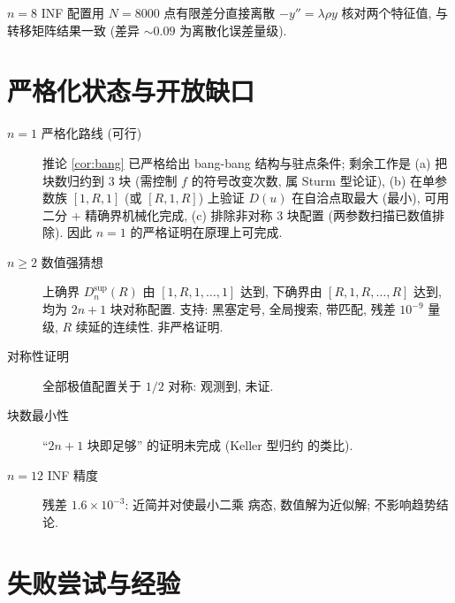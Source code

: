 \documentclass[UTF8]{ctexart}
\begin{document}
$n=8$ INF 配置用 $N = 8000$ 点有限差分直接离散 $-y'' = \lambda\rho y$
核对两个特征值, 与转移矩阵结果一致 (差异 $\sim 0.09$ 为离散化误差量级).

\section{严格化状态与开放缺口}\label{sec:open}

\begin{description}
	\item[$n = 1$ 严格化路线 (可行)] 推论 \ref{cor:bang} 已严格给出
		bang-bang 结构与驻点条件; 剩余工作是 (a) 把块数归约到 3 块
		(需控制 $f$ 的符号改变次数, 属 Sturm 型论证), (b) 在单参数族
		$[1,R,1]$ (或 $[R,1,R]$) 上验证 $D(u)$ 在自洽点取最大 (最小),
		可用二分 + 精确界机械化完成, (c) 排除非对称 3 块配置
		(两参数扫描已数值排除). 因此 $n=1$ 的严格证明在原理上可完成.
	\item[$n \geq 2$ 数值强猜想] 上确界 $D_n^{\mathrm{sup}}(R)$ 由
		$[1,R,1,\dots,1]$ 达到, 下确界由 $[R,1,R,\dots,R]$ 达到,
		均为 $2n+1$ 块对称配置. 支持: 黑塞定号, 全局搜索, 带匹配,
		残差 $10^{-9}$ 量级, $R$ 续延的连续性. 非严格证明.
	\item[对称性证明] 全部极值配置关于 $1/2$ 对称: 观测到, 未证.
	\item[块数最小性] ``$2n+1$ 块即足够'' 的证明未完成 (Keller 型归约
		的类比).
	\item[$n=12$ INF 精度] 残差 $1.6\times10^{-3}$: 近简并对使最小二乘
		病态, 数值解为近似解; 不影响趋势结论.
\end{description}

\section{失败尝试与经验}\label{sec:fail}
\end{document}

